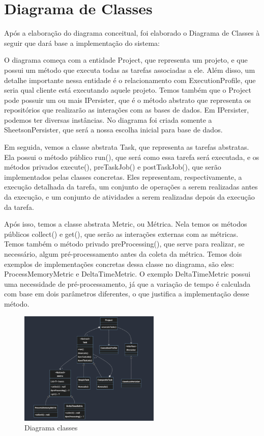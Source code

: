 \documentclass[12pt]{tcc}
\begin{document}
\section{Diagrama de Classes}

Após a elaboração do diagrama conceitual, foi elaborado o Diagrama de Classes à seguir que dará base a implementação do sistema: 

O diagrama começa com a entidade Project, que representa um projeto, e que possui um método que executa todas as tarefas associadas a ele.
Além disso, um detalhe importante nessa entidade é o relacionamento com ExecutionProfile, que seria qual cliente está executando aquele projeto. Temos também que o Project pode possuir um ou mais IPersister, que é o método abstrato que representa os repositórios que realizarão as interações com as bases de dados. Em IPersister, podemos ter diversas instâncias.
No diagrama foi criada somente a SheetsonPersister, que será a nossa escolha inicial para base de dados.

Em seguida, vemos a classe abstrata Task, que representa as tarefas abstratas.
Ela possui o método público run(), que será como essa tarefa será executada, e os métodos privados execute(), preTaskJob() e postTaskJob(), que serão implementados pelas classes concretas.
Eles representam, respectivamente, a execução detalhada da tarefa, um conjunto de operações a serem realizadas antes da execução, e um conjunto de atividades a serem realizadas depois da execução da tarefa.

Após isso, temos a classe abstrata Metric, ou Métrica.
Nela temos os métodos públicos collect() e get(), que serão as interações externas com as métricas.
Temos também o método privado preProcessing(), que serve para realizar, se necessário, algum pré-processamento antes da coleta da métrica.
Temos dois exemplos de implementações concretas dessa classe no diagrama, são eles:
ProcessMemoryMetric e DeltaTimeMetric. O exemplo DeltaTimeMetric possui uma necessidade de pré-processamento, já que a variação de tempo é calculada com base em dois parâmetros diferentes, o que justifica a implementação desse método.


\begin{figure}[!ht]
	\centering
	\includegraphics[width=0.6\textwidth]{figures/diagrama-classes.png}
	\caption{Diagrama classes}
	\label{fig:diag-classes}
\end{figure}
\end{document}
